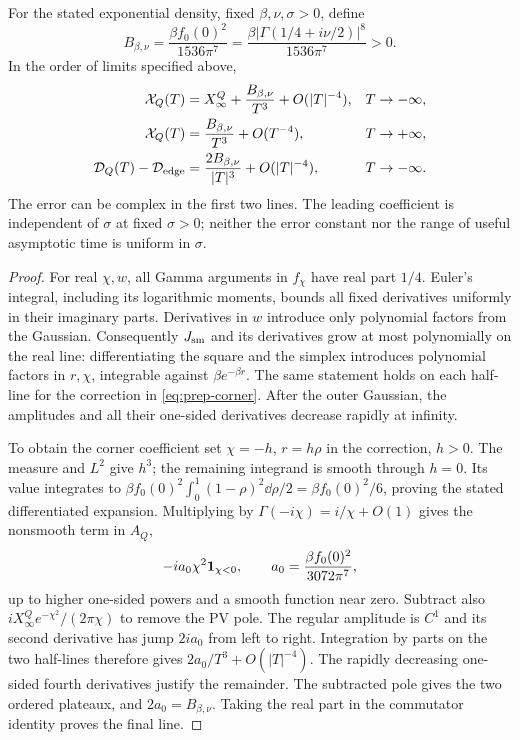 \begin{theorem}
For the stated exponential density, fixed $\beta,\nu,\sigma>0$, define
\begin{equation}
 B_{\beta,\nu}=\frac{\beta f_0(0)^2}{1536\pi^7}
   =\frac{\beta|\Gamma(1/4+i\nu/2)|^8}{1536\pi^7}>0.
 \label{eq:prep-cubic-coefficient}
\end{equation}
In the order of limits specified above,
\begin{align}
 \mathcal X_Q(T)&=X^Q_\infty+\frac{B_{\beta,\nu}}{T^3}
                           +O(|T|^{-4}),&&T\to-\infty,\notag\\
 \mathcal X_Q(T)&=\frac{B_{\beta,\nu}}{T^3}
                           +O(T^{-4}),&&T\to+\infty,\notag\\
 \mathcal D_Q(T)-\mathcal D_{\rm edge}
     &=\frac{2B_{\beta,\nu}}{|T|^3}+O(|T|^{-4}),&&T\to-\infty.
 \label{eq:prep-moving-cubic}
\end{align}
The error can be complex in the first two lines. The leading coefficient
is independent of $\sigma$ at fixed $\sigma>0$; neither the error
constant nor the range of useful asymptotic time is uniform in $\sigma$.
\label{thm:prep-moving}
\end{theorem}
\begin{proof}
For real $\chi,w$, all Gamma arguments in $f_\chi$ have real part
$1/4$. Euler's integral, including its logarithmic moments, bounds all
fixed derivatives uniformly in their imaginary parts. Derivatives in
$w$ introduce only polynomial factors from the Gaussian. Consequently
$J_{\rm sm}$ and its derivatives grow at most polynomially on the real
line: differentiating the square and the simplex introduces polynomial
factors in $r,\chi$, integrable against $\beta e^{-\beta r}$.
The same statement holds on each half-line for the correction in
\eqref{eq:prep-corner}. After the outer Gaussian, the amplitudes and
all their one-sided derivatives decrease rapidly at infinity.

To obtain the corner coefficient set $\chi=-h$, $r=h\rho$ in the
correction, $h>0$. The measure and $L^2$ give $h^3$; the remaining
integrand is smooth through $h=0$. Its value integrates to
$\beta f_0(0)^2\int_0^1(1-\rho)^2\dd\rho/2
=\beta f_0(0)^2/6$, proving the stated differentiated expansion.
Multiplying by $\Gamma(-i\chi)=i/\chi+O(1)$ gives the nonsmooth term
in $A_Q$,
\begin{equation}
 -i a_0\chi^2\mathbf 1_{\chi<0},\qquad
 a_0=\frac{\beta f_0(0)^2}{3072\pi^7},
 \label{eq:prep-corner-amplitude}
\end{equation}
up to higher one-sided powers and a smooth function near zero. Subtract
also $iX^Q_\infty e^{-\chi^2}/(2\pi\chi)$ to remove the PV pole.
The regular amplitude is $C^1$ and its second derivative has jump
$2ia_0$ from left to right. Integration by parts on the two half-lines
therefore gives $2a_0/T^3+O(|T|^{-4})$. The rapidly decreasing
one-sided fourth derivatives justify the remainder. The subtracted pole
gives the two ordered plateaux, and $2a_0=B_{\beta,\nu}$. Taking the
real part in the commutator identity proves the final line.
\end{proof}
